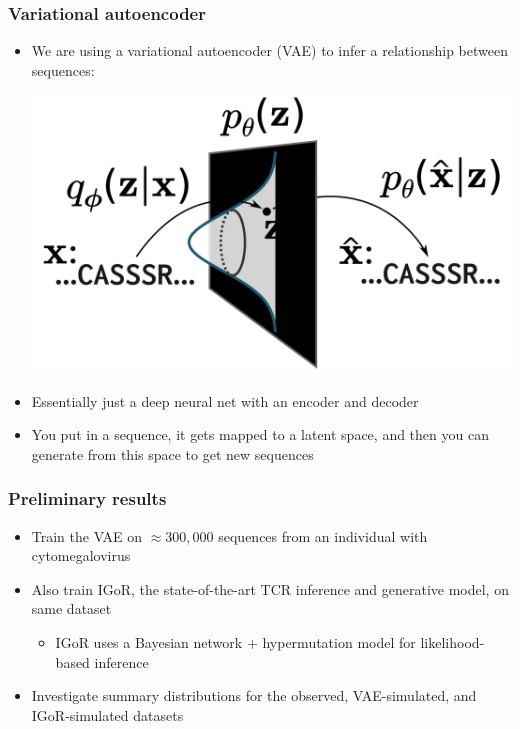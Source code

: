\documentclass[mathserif,compress]{beamer}
\renewcommand\;{\,}
\begin{document}
\begin{frame}\frametitle{Variational autoencoder}
\begin{itemize}
\item
We are using a variational autoencoder (VAE) to infer a relationship between sequences:
\begin{center}
\includegraphics[width=0.7\linewidth]{Images/VAE.png}
\end{center}
\item
Essentially just a deep neural net with an encoder and decoder
\bigskip
\item
You put in a sequence, it gets mapped to a latent space, and then you can generate from this space to get new sequences

\end{itemize}
\end{frame}

\begin{frame}\frametitle{Preliminary results}
\begin{itemize}
\item
Train the VAE on $\approx300,000$ sequences from an individual with cytomegalovirus
\bigskip
\item
Also train IGoR, the state-of-the-art TCR inference and generative model, on same dataset
\bigskip
\begin{itemize}
\item
IGoR uses a Bayesian network $+$ hypermutation model for likelihood-based inference
\end{itemize}
\bigskip
\item
Investigate summary distributions for the observed, VAE-simulated, and IGoR-simulated datasets 
\end{itemize}
\end{frame}
\end{document}
